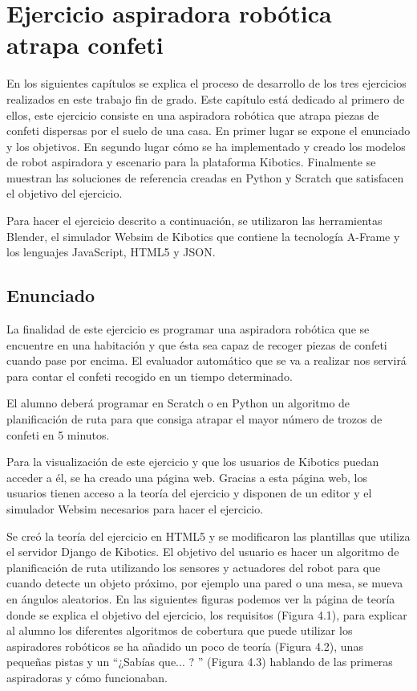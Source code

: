\chapter{Ejercicio aspiradora robótica atrapa confeti}\label{chap:aspiradora}
En los siguientes capítulos se explica el proceso de desarrollo de los tres ejercicios realizados en este trabajo fin de grado. Este capítulo está dedicado al primero de ellos, este ejercicio consiste en una aspiradora robótica que atrapa piezas de confeti dispersas por el suelo de una casa. En primer lugar se expone el enunciado y los objetivos. En segundo lugar cómo se ha implementado y creado los modelos de robot aspiradora y escenario para la plataforma Kibotics. Finalmente se muestran las soluciones de referencia creadas en Python y Scratch que satisfacen el objetivo del ejercicio.

Para hacer el ejercicio descrito a continuación, se utilizaron las herramientas Blender, el simulador Websim de Kibotics que contiene la tecnología A-Frame y los lenguajes JavaScript, HTML5 y JSON.

\section{Enunciado}
La finalidad de este ejercicio es programar una aspiradora robótica que se encuentre en una habitación y que ésta sea capaz de recoger piezas de confeti cuando pase por encima. El evaluador automático que se va a realizar nos servirá para contar el confeti recogido en un tiempo determinado.

El alumno deberá programar en Scratch o en Python un algoritmo de planificación de ruta para que consiga atrapar el mayor número de trozos de confeti en 5 minutos.

Para la visualización de este ejercicio y que los usuarios de Kibotics puedan acceder a él, se ha creado una página web. Gracias a esta página web, los usuarios tienen acceso a la teoría del ejercicio y  disponen de un editor y el simulador Websim necesarios para hacer el ejercicio. 

Se creó la teoría del ejercicio en HTML5 y se modificaron las plantillas que utiliza el servidor Django de Kibotics. El objetivo del usuario  es hacer un algoritmo de planificación de ruta utilizando los sensores y actuadores del robot para que cuando detecte un objeto próximo, por ejemplo una pared o una mesa, se mueva en ángulos aleatorios. 
En las siguientes figuras podemos ver la página de teoría donde se explica el objetivo del ejercicio, los requisitos (Figura 4.1), para explicar al alumno los diferentes algoritmos de cobertura que puede utilizar los aspiradores robóticos se ha añadido un poco de teoría (Figura  4.2), unas pequeñas pistas y un ``¿Sabías que... ? '' (Figura 4.3) hablando de las primeras aspiradoras y cómo funcionaban. 
\\

